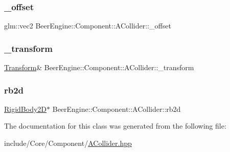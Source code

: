 \subsubsection{\texorpdfstring{\+\_\+offset}{\_offset}}
{\footnotesize\ttfamily glm\+::vec2 Beer\+Engine\+::\+Component\+::\+A\+Collider\+::\+\_\+offset}

\mbox{\label{class_beer_engine_1_1_component_1_1_a_collider_a4e4c356e177c7cfa07d36b76216dd993}} 
\subsubsection{\texorpdfstring{\+\_\+transform}{\_transform}}
{\footnotesize\ttfamily \mbox{\hyperlink{class_beer_engine_1_1_transform}{Transform}}\& Beer\+Engine\+::\+Component\+::\+A\+Collider\+::\+\_\+transform}

\mbox{\label{class_beer_engine_1_1_component_1_1_a_collider_aa3e90975f78f74ae4c0cd559b91725dc}} 
\subsubsection{\texorpdfstring{rb2d}{rb2d}}
{\footnotesize\ttfamily \mbox{\hyperlink{class_beer_engine_1_1_component_1_1_rigid_body2_d}{Rigid\+Body2D}}$\ast$ Beer\+Engine\+::\+Component\+::\+A\+Collider\+::rb2d}



The documentation for this class was generated from the following file\+:\begin{DoxyCompactItemize}
\item 
include/\+Core/\+Component/\mbox{\hyperlink{_a_collider_8hpp}{A\+Collider.\+hpp}}\end{DoxyCompactItemize}
